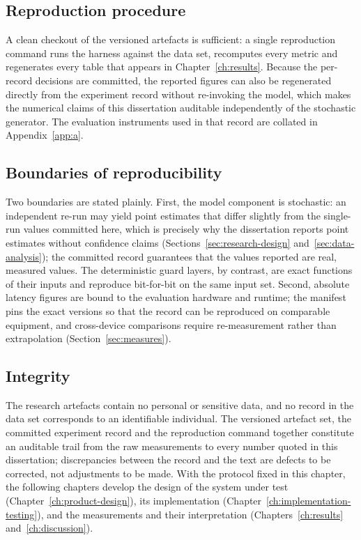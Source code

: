 \subsection*{Reproduction procedure}

A clean checkout of the versioned artefacts is sufficient: a single reproduction
command runs the harness against the data set, recomputes every metric and
regenerates every table that appears in Chapter~\ref{ch:results}. Because the
per-record decisions are committed, the reported figures can also be regenerated
directly from the experiment record without re-invoking the model, which makes
the numerical claims of this dissertation auditable independently of the
stochastic generator. The evaluation instruments used in that record are
collated in Appendix~\ref{app:a}.

\subsection*{Boundaries of reproducibility}

Two boundaries are stated plainly. First, the model component is stochastic:
an independent re-run may yield point estimates that differ slightly from the
single-run values committed here, which is precisely why the dissertation
reports point estimates without confidence claims (Sections~\ref{sec:research-design}
and~\ref{sec:data-analysis}); the committed record guarantees that the values
reported are real, measured values. The deterministic guard layers, by contrast,
are exact functions of their inputs and reproduce bit-for-bit on the same input
set. Second, absolute latency figures are bound to the evaluation hardware and
runtime; the manifest pins the exact versions so that the record can be
reproduced on comparable equipment, and cross-device comparisons require
re-measurement rather than extrapolation (Section~\ref{sec:measures}).

\subsection*{Integrity}

The research artefacts contain no personal or sensitive data, and no record in
the data set corresponds to an identifiable individual. The versioned artefact
set, the committed experiment record and the reproduction command together
constitute an auditable trail from the raw measurements to every number quoted
in this dissertation; discrepancies between the record and the text are defects
to be corrected, not adjustments to be made. With the protocol fixed in this
chapter, the following chapters develop the design of the system under test
(Chapter~\ref{ch:product-design}), its implementation (Chapter~\ref{ch:implementation-testing}),
and the measurements and their interpretation (Chapters~\ref{ch:results}
and~\ref{ch:discussion}).


